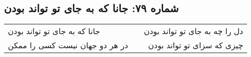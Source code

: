 \begin{center}
\section*{شماره ۷۹: جانا که به جای تو تواند بودن}
\label{sec:079}
\begin{longtable}{l p{0.5cm} r}
جانا که به جای تو تواند بودن
&&
دل را چه به جای تو تواند بودن
\\
در هر دو جهان نیست کسی را ممکن
&&
چیزی که سزای تو تواند بودن
\\
\end{longtable}
\end{center}

